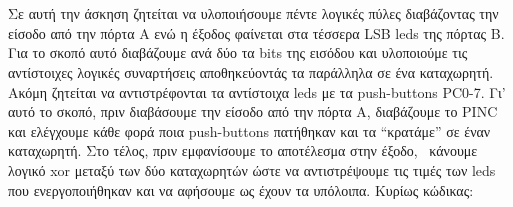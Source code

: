 \section{}

Σε αυτή την άσκηση ζητείται να υλοποιήσουμε πέντε λογικές πύλες διαβάζοντας
την είσοδο από την πόρτα Α ενώ η έξοδος φαίνεται στα τέσσερα LSB leds της
πόρτας Β. Για το σκοπό αυτό διαβάζουμε ανά δύο τα bits της εισόδου και
υλοποιούμε τις αντίστοιχες λογικές συναρτήσεις αποθηκεύοντάς τα παράλληλα σε
ένα καταχωρητή. Ακόμη ζητείται να αντιστρέφονται τα αντίστοιχα leds με τα
push-buttons PC0-7. Γι’ αυτό το σκοπό, πριν διαβάσουμε την είσοδο από την
πόρτα Α, διαβάζουμε το PINC και ελέγχουμε κάθε φορά ποια push-buttons
πατήθηκαν και τα “κρατάμε” σε έναν καταχωρητή. Στο τέλος, πριν εμφανίσουμε το
αποτέλεσμα στην έξοδο,  κάνουμε λογικό xor μεταξύ των δύο καταχωρητών ώστε να
αντιστρέψουμε τις τιμές των leds που ενεργοποιήθηκαν και να αφήσουμε ως έχουν
τα υπόλοιπα.
\noindent Κυρίως κώδικας:
\inputminted[linenos,obeytabs,fontsize=\footnotesize]{c}{files/part1.S}
